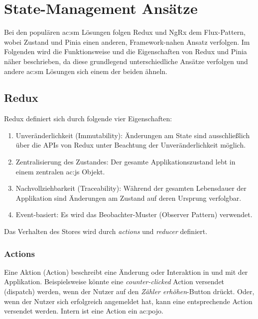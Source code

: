 \chapter{State-Management Ansätze} \label{sm-ansaetze}

Bei den populären \acrshort{ac:sm} Lösungen folgen Redux und NgRx dem Flux-Pattern\cite{historyOfRedux}\cite{ngrxGettingStarted}, wobei Zustand und Pinia einen anderen, Framework-nahen Ansatz verfolgen. Im Folgenden wird die Funktionsweise und die Eigenschaften von Redux und Pinia näher beschrieben, da diese grundlegend unterschiedliche Ansätze verfolgen und andere \acrshort{ac:sm} Lösungen sich einem der beiden ähneln.

\section{Redux}

Redux definiert sich durch folgende vier Eigenschaften:
\begin{enumerate}
  \item Unveränderlichkeit (Immutability): Änderungen am State sind ausschließlich über die APIs von Redux unter Beachtung der Unveränderlichkeit möglich.
  \item Zentralisierung des Zustandes: Der gesamte Applikationszustand lebt in einem zentralen \acrlong{ac:js} Objekt.
  \item Nachvollziehbarkeit (Traceability): Während der gesamten Lebensdauer der Applikation sind Änderungen am Zustand auf deren Ursprung verfolgbar.
  \item Event-basiert: Es wird das Beobachter-Muster (Observer Pattern) verwendet.
\end{enumerate}

Das Verhalten des Stores wird durch \textit{actions} und \textit{reducer} definiert.

\subsection{Actions}

Eine Aktion (Action) beschreibt eine Änderung oder Interaktion in und mit der Applikation. Beispielsweise könnte eine \textit{counter-clicked} Action versendet (dispatch) werden, wenn der Nutzer auf den \textit{Zähler erhöhen}-Button drückt. Oder, wenn der Nutzer sich erfolgreich angemeldet hat, kann eine entsprechende Action versendet werden. Intern ist eine Action ein \acrshort{ac:pojo}.\cite{reduxStateActionReducers}

